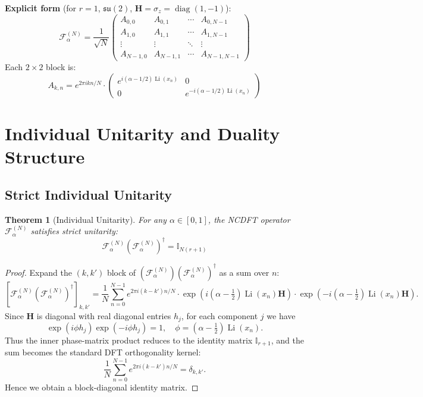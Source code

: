 \documentclass[12pt,a4paper]{amsart}
\theoremstyle{plain}
\newtheorem{theorem}{Theorem}[section]
\theoremstyle{definition}
\theoremstyle{remark}
\begin{document}
\textbf{Explicit form} (for $r=1$, $\mathfrak{su}(2)$, $\mathbf{H}=\sigma_z=\operatorname{diag}(1,-1)$):
\[
\mathcal{F}_\alpha^{(N)} = \frac{1}{\sqrt{N}} \begin{pmatrix} 
A_{0,0} & A_{0,1} & \cdots & A_{0,N-1} \\
A_{1,0} & A_{1,1} & \cdots & A_{1,N-1} \\
\vdots & \vdots & \ddots & \vdots \\
A_{N-1,0} & A_{N-1,1} & \cdots & A_{N-1,N-1}
\end{pmatrix}
\]
Each $2 \times 2$ block is:
\[
A_{k,n} = e^{2\pi i k n/N} \cdot \begin{pmatrix} 
e^{i(\alpha-1/2)\operatorname{Li}(x_n)} & 0 \\
0 & e^{-i(\alpha-1/2)\operatorname{Li}(x_n)}
\end{pmatrix}
\]

\section{Individual Unitarity and Duality Structure}

\subsection{Strict Individual Unitarity}

\begin{theorem}[Individual Unitarity]\label{thm:unitarity}
For any $\alpha \in [0,1]$, the NCDFT operator $\mathcal{F}_\alpha^{(N)}$ satisfies strict unitarity:
\[
\mathcal{F}_\alpha^{(N)} (\mathcal{F}_\alpha^{(N)})^\dagger = \mathbb{I}_{N(r+1)}
\]
\end{theorem}

\begin{proof}
Expand the $(k,k')$ block of $(\mathcal{F}_\alpha^{(N)})(\mathcal{F}_\alpha^{(N)})^\dagger$ as a sum over $n$:
\[
[\mathcal{F}_\alpha^{(N)} (\mathcal{F}_\alpha^{(N)})^\dagger]_{k,k'} = \frac{1}{N} \sum_{n=0}^{N-1} e^{2\pi i (k-k')n/N} \cdot \exp\left(i(\alpha-\tfrac{1}{2})\operatorname{Li}(x_n)\mathbf{H}\right) \cdot \exp\left(-i(\alpha-\tfrac{1}{2})\operatorname{Li}(x_n)\mathbf{H}\right).
\]
Since $\mathbf{H}$ is diagonal with real diagonal entries $h_j$, for each component $j$ we have
\[
\exp(i\phi h_j)\exp(-i\phi h_j)=1,\quad \phi=(\alpha-\tfrac12)\operatorname{Li}(x_n).
\]
Thus the inner phase-matrix product reduces to the identity matrix $\mathbb{I}_{r+1}$, and the sum becomes the standard DFT orthogonality kernel:
\[
\frac{1}{N}\sum_{n=0}^{N-1}e^{2\pi i(k-k')n/N}=\delta_{k,k'}.
\]
Hence we obtain a block-diagonal identity matrix.
\end{proof}
\end{document}
